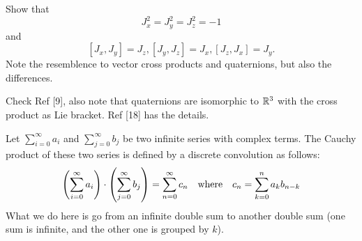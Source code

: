 \documentclass[10pt]{article}
\begin{document}
\begin{example}
	Show that
	$$
	J_x^2 = J_y^2 = J_z^2 = -1
	$$
	and
	$$
	[J_x,J_y] = J_z, [J_y,J_z] = J_x, [J_z,J_x] = J_y.
	$$
	Note the resemblence to vector cross products and quaternions, but also the differences.
\end{example}
\sol Check Ref [9], also note that quaternions are isomorphic to $\R^3$ with the cross product as Lie bracket. Ref [18] has the details.


\begin{definition}
	 Let $\sum_{i=0}^{\infty} a_i$ and $\sum_{j=0}^{\infty} b_j$ be two infinite series with complex terms. The Cauchy product of these two series is defined by a discrete convolution as follows:
	$$
	\p*{\sum_{i=0}^{\infty} a_i}\cdot\p*{\sum_{j=0}^{\infty} b_j} = \sum_{n=0}^{\infty}c_n\quad\text{where}\quad c_n = \sum_{k=0}^{n}a_kb_{n-k}
	$$
	What we do here is go from an infinite double sum to another double sum (one sum is infinite, and the other one is grouped by $k$).
\end{definition}
\end{document}
